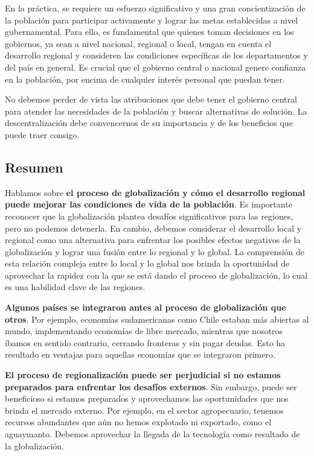 \documentclass[
  jou,
  floatsintext,
  longtable,
  a4paper,
  nolmodern,
  notxfonts,
  notimes,
  12pt,
  colorlinks=true,linkcolor=blue,citecolor=blue,urlcolor=blue]{apa7}
\begin{document}
En la práctica, se requiere un esfuerzo significativo y una gran
concientización de la población para participar activamente y lograr las
metas establecidas a nivel gubernamental. Para ello, es fundamental que
quienes toman decisiones en los gobiernos, ya sean a nivel nacional,
regional o local, tengan en cuenta el desarrollo regional y consideren
las condiciones específicas de los departamentos y del país en general.
Es crucial que el gobierno central o nacional genere confianza en la
población, por encima de cualquier interés personal que puedan tener.

No debemos perder de vista las atribuciones que debe tener el gobierno
central para atender las necesidades de la población y buscar
alternativas de solución. La descentralización debe convencernos de su
importancia y de los beneficios que puede traer consigo.

\subsection{Resumen}\label{resumen}

Hablamos sobre \textbf{el proceso de globalización y cómo el desarrollo
regional puede mejorar las condiciones de vida de la población}. Es
importante reconocer que la globalización plantea desafíos
significativos para las regiones, pero no podemos detenerla. En cambio,
debemos considerar el desarrollo local y regional como una alternativa
para enfrentar los posibles efectos negativos de la globalización y
lograr una fusión entre lo regional y lo global. La comprensión de esta
relación compleja entre lo local y lo global nos brinda la oportunidad
de aprovechar la rapidez con la que se está dando el proceso de
globalización, lo cual es una habilidad clave de las regiones.

\textbf{Algunos países se integraron antes al proceso de globalización
que otros}. Por ejemplo, economías sudamericanas como Chile estaban más
abiertas al mundo, implementando economías de libre mercado, mientras
que nosotros íbamos en sentido contrario, cerrando fronteras y sin pagar
deudas. Esto ha resultado en ventajas para aquellas economías que se
integraron primero.

\textbf{El proceso de regionalización puede ser perjudicial si no
estamos preparados para enfrentar los desafíos externos}. Sin embargo,
puede ser beneficioso si estamos preparados y aprovechamos las
oportunidades que nos brinda el mercado externo. Por ejemplo, en el
sector agropecuario, tenemos recursos abundantes que aún no hemos
explotado ni exportado, como el aguaymanto. Debemos aprovechar la
llegada de la tecnología como resultado de la globalización.
\end{document}

